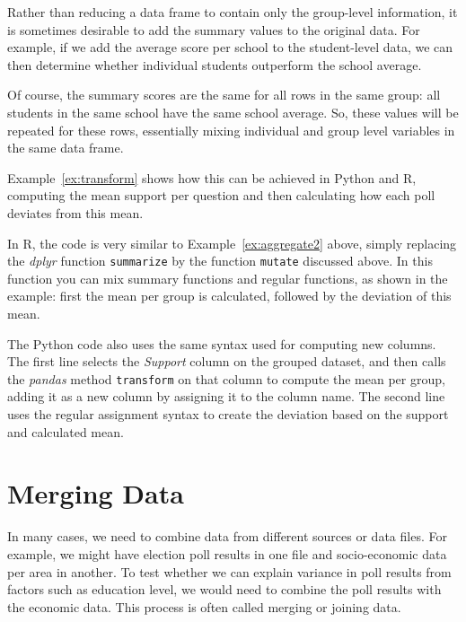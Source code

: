 Rather than reducing a data frame to contain only the group-level information,
it is sometimes desirable to add the summary values to the original data.
For example, if we add the average score per school to the student-level data,
we can then determine whether individual students outperform the school average.

Of course, the summary scores are the same for all rows in the same group:
all students in the same school have the same school average.
So, these values will be repeated for these rows, essentially
mixing individual and group level variables in the same data frame.


Example~\ref{ex:transform} shows how this can be achieved in Python and R,
computing the mean support per question and then calculating how each poll deviates from this mean.

In R, the code is very similar to Example~\ref{ex:aggregate2} above, simply
replacing the \emph{dplyr} function \texttt{summarize} by the function \texttt{mutate} discussed above.
In this function you can mix summary functions and regular functions, as shown in the example:
first the mean per group is calculated, followed by the deviation of this mean.

The Python code also uses the same syntax used for computing new columns.
The first line selects the \emph{Support} column on the grouped dataset,
and then calls the \emph{pandas} method \texttt{transform} on that column to compute the mean per group,
adding it as a new column by assigning it to the column name.
The second line uses the regular assignment syntax to create the deviation based on the support and calculated mean.

\section{Merging Data}
\label{sec:join}

In many cases, we need to combine data from different sources or data files.
For example, we might have election poll results in one file and socio-economic data per area in another.
To test whether we can explain variance in poll results from factors such as education level,
we would need to combine the poll results with the economic data.
This process is often called merging or joining data.

